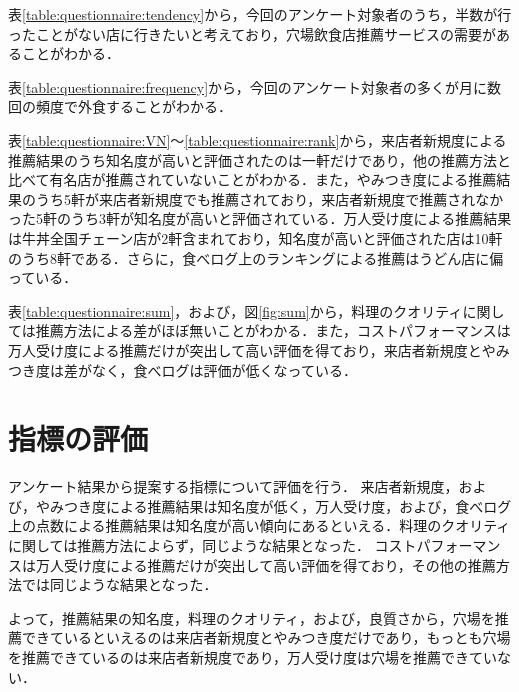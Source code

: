 	\par
	表\ref{table:questionnaire:tendency}から，今回のアンケート対象者のうち，半数が行ったことがない店に行きたいと考えており，穴場飲食店推薦サービスの需要があることがわかる．\par
	表\ref{table:questionnaire:frequency}から，今回のアンケート対象者の多くが月に数回の頻度で外食することがわかる．\par
	表\ref{table:questionnaire:VN}〜\ref{table:questionnaire:rank}から，来店者新規度による推薦結果のうち知名度が高いと評価されたのは一軒だけであり，他の推薦方法と比べて有名店が推薦されていないことがわかる．また，やみつき度による推薦結果のうち5軒が来店者新規度でも推薦されており，来店者新規度で推薦されなかった5軒のうち3軒が知名度が高いと評価されている．万人受け度による推薦結果は牛丼全国チェーン店が2軒含まれており，知名度が高いと評価された店は10軒のうち8軒である．さらに，食べログ上のランキングによる推薦はうどん店に偏っている．\par
	表\ref{table:questionnaire:sum}，および，図\ref{fig:sum}から，料理のクオリティに関しては推薦方法による差がほぼ無いことがわかる．また，コストパフォーマンスは万人受け度による推薦だけが突出して高い評価を得ており，来店者新規度とやみつき度は差がなく，食べログは評価が低くなっている．

\section{指標の評価}
アンケート結果から提案する指標について評価を行う．
来店者新規度，および，やみつき度による推薦結果は知名度が低く，万人受け度，および，食べログ上の点数による推薦結果は知名度が高い傾向にあるといえる．料理のクオリティに関しては推薦方法によらず，同じような結果となった．
コストパフォーマンスは万人受け度による推薦だけが突出して高い評価を得ており，その他の推薦方法では同じような結果となった．%
\par
よって，推薦結果の知名度，料理のクオリティ，および，良質さから，穴場を推薦できているといえるのは来店者新規度とやみつき度だけであり，もっとも穴場を推薦できているのは来店者新規度であり，万人受け度は穴場を推薦できていない．
